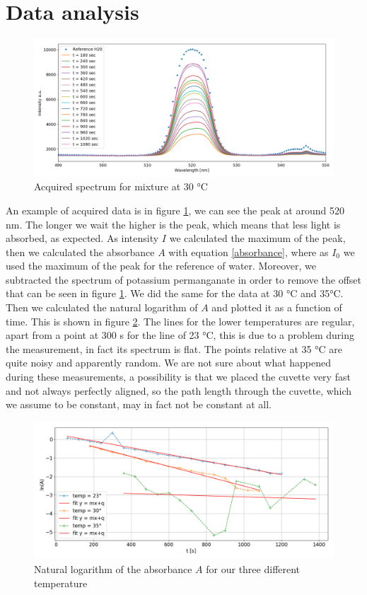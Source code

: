 \documentclass[a4paper,10pt]{article}
\begin{document}
\section{Data analysis}
\begin{figure}[H]
\centering
\includegraphics[width=\textwidth]{spectrum30}
\caption{Acquired spectrum for mixture at 30 °C}\label{spectrum}
\end{figure}
An example of acquired data is in figure \ref{spectrum}, we can see the peak at around 520 nm. The longer we wait the higher is the peak, which means that less light is absorbed, as expected. 
As intensity $I$ we calculated the maximum of the peak, then we calculated the absorbance $A$ with equation \eqref{absorbance}, where as $I_0$ we used the maximum of the peak for the reference of water. Moreover, we subtracted the spectrum of potassium permanganate in order to remove the offset that can be seen in figure \ref{spectrum}. We did the same for the data at 30 °C and 35°C. Then we calculated the natural logarithm of $A$ and plotted it as a function of time. This is shown in figure \ref{fit}. The lines for the lower temperatures are regular, apart from a point at 300 s for the line of 23 °C, this is due to a problem during the measurement, in fact its spectrum is flat. The points relative at 35 °C are quite noisy and apparently random. We are not sure about what happened during these measurements, a possibility is that we placed the cuvette very fast and not always perfectly aligned, so the path length through the cuvette, which we assume to be constant, may in fact not be constant at all. 
\begin{figure}[H]
\centering
\includegraphics[width=\textwidth]{fit}
\caption{Natural logarithm of the absorbance $A$ for our three different temperature}\label{fit}
\end{figure}
\end{document}
